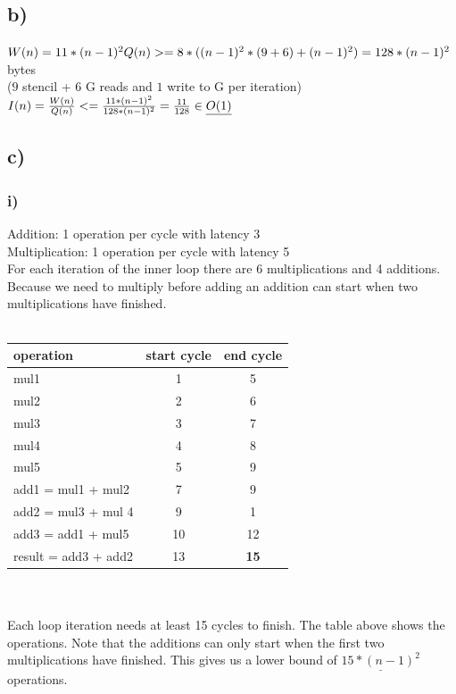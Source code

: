 \documentclass[10pt,a4paper,oneside,notitlepage]{report}
\begin{document}
\subsection*{b)}
$W(n) = 11*(n-1)^2 \\
Q(n) >= 8*((n-1)^2*(9 + 6) + (n-1)^2 ) = 128*(n-1)^2$  bytes \\($9$ stencil + $6$ G reads and $1$ write to G per iteration) \\
$I(n) = {W(n) \over Q(n)} <= {11*(n-1)^2 \over 128*(n-1)^2} = {11 \over 128} \in \underline{O(1)}$
\subsection*{c)}
\subsubsection*{i)}
Addition: 1 operation per cycle with latency 3 \\
Multiplication: 1 operation per cycle with latency 5 \\
For each iteration of the inner loop there are 6 multiplications and 4 additions. Because we need to multiply before adding an addition can start when two multiplications have finished.  \\ \\
\begin{tabular}{|l|c|c|}
\hline 
\rowcolor{gray!30}
\textbf{operation} & \textbf{start cycle} & \textbf{end cycle }\\ 
\hline 
mul1 & 1 & 5 \\ 
\hline 
mul2 & 2 & 6 \\ 
\hline 
mul3 & 3 & 7 \\ 
\hline 
mul4 & 4 & 8 \\ 
\hline 
mul5 & 5 & 9 \\ 
\hline 
add1 = mul1 + mul2 & 7 & 9 \\ 
\hline 
add2 = mul3 + mul 4 & 9 & 1 \\ 
\hline 
add3 = add1 + mul5 & 10 & 12 \\ 
\hline 
result = add3 + add2 & 13 & \textbf{15} \\ 
\hline 
\end{tabular}  \\ \\
Each loop iteration needs at least 15 cycles to finish. The table above shows the operations. Note that the additions can only start when the first two multiplications have finished. This gives us a lower bound of $\underline{15*(n-1)^2}$ operations.
\end{document}
